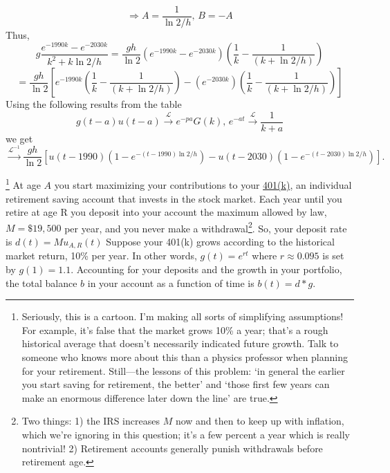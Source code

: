 \documentclass[answers]{exam}\newcommand{\repositoryInformationSetup}{     \usepackage[dvipsnames]{xcolor}     \usepackage[ angle=90, color=black, opacity=1, scale=2, ]{background}      \SetBgPosition{current page.west}      \SetBgVshift{-4.5mm}      \backgroundsetup{contents={{\color{green}\texttt{-{}-} differs from commit \texttt{40a9b87} in 0 files}}} } \newcommand{\commit}{{{\color{green}40a9b87}}}\usepackage{amsmath}
\begin{document}
\begin{questions}
\begin{solution}
		$$ \Rightarrow A = \frac{1}{\ln2/h} \textbf{, } B = -A $$
		Thus,
		$$ g \frac{e^{-1990k} - e^{-2030k}}{k^2+k\ln2/h} = \frac{gh}{\ln2} (e^{-1990k} - e^{-2030k})(\frac{1}{k} - \frac{1}{(k + \ln2/h)}) $$
		$$ = \frac{gh}{\ln2} \left[ e^{-1990k}(\frac{1}{k} - \frac{1}{(k + \ln2/h)}) - (e^{-2030k}) (\frac{1}{k} - \frac{1}{(k + \ln2/h)})\right] $$
		Using the following results from the table
		$$ g(t-a)u(t-a) \stackrel{\mathcal{L}}{\rightarrow} e^{-pa}G(k) \textbf{, } e^{-at} \stackrel{\mathcal{L}}{\rightarrow} \frac{1}{k+a}$$
		we get
		$$\stackrel{\mathcal{L}^{-1}}{\rightarrow}  \frac{gh}{\ln 2} \left[u(t-1990)\left(1-e^{-(t-1990) \ln 2/h} \right)- u(t-2030)\left(1-e^{-(t-2030) \ln 2 / h}\right)\right].$$

	\end{solution}

	\footnote{
		Seriously, this is a cartoon.
		I'm making all sorts of simplifying assumptions!
		For example, it's false that the market grows 10\% a year; that's a rough historical average that doesn't necessarily indicated future growth.
		Talk to someone who knows more about this than a physics professor when planning for your retirement.
		Still---the lessons of this problem:
		`in general the earlier you start saving for retirement, the better'
		and
		`those first few years can make an enormous difference later down the line' are true.
	}
	At age $A$ you start maximizing your contributions to your \href{https://en.wikipedia.org/wiki/401(k)}{401(k)}, an individual retirement saving account that invests in the stock market.
	Each year until you retire at age R you deposit into your account the maximum allowed by law, $M=\$19,500$ per year, and you never make a withdrawal\footnote{
		Two things:
		1) the IRS increases $M$ now and then to keep up with inflation, which we're ignoring in this question; it's a few percent a year which is really nontrivial!
		2) Retirement accounts generally punish withdrawals before retirement age.
	}.
	So, your deposit rate is $d(t) = M u_{A,R}(t)$
	Suppose your 401(k) grows according to the historical market return, 10\% per year.
	In other words, $g(t) = e^{rt}$ where $r\approx 0.095$ is set by $g(1) = 1.1$.
	Accounting for your deposits and the growth in your portfolio, the total balance $b$ in your account as a function of time is $b(t) = d*g$.

	\begin{parts}

\end{parts}
\end{questions}
\end{document}
